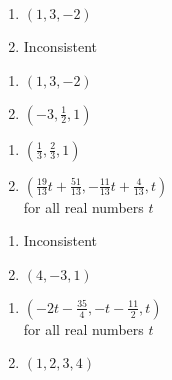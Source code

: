 \begin{multicols}{2}
\begin{enumerate}
\setcounter{enumi}{\value{HW}}

\item $(1,3,-2)$
\item Inconsistent


\setcounter{HW}{\value{enumi}}
\end{enumerate}
\end{multicols}


\begin{multicols}{2}
\begin{enumerate}
\setcounter{enumi}{\value{HW}}


\item $(1,3,-2)$
\item $\left(-3,\frac{1}{2},1\right)$

\setcounter{HW}{\value{enumi}}
\end{enumerate}
\end{multicols}


\begin{multicols}{2}
\begin{enumerate}
\setcounter{enumi}{\value{HW}}



\item  $\left(\frac{1}{3},\frac{2}{3},1\right)$
\item  $\left(\frac{19}{13} t + \frac{51}{13},-\frac{11}{13} t+\frac{4}{13},t\right)$\\
for all real numbers $t$

\setcounter{HW}{\value{enumi}}
\end{enumerate}
\end{multicols}


\begin{multicols}{2}
\begin{enumerate}
\setcounter{enumi}{\value{HW}}

\item Inconsistent
\item $\left(4,-3,1\right)$

\setcounter{HW}{\value{enumi}}
\end{enumerate}
\end{multicols}


\begin{multicols}{2}
\begin{enumerate}
\setcounter{enumi}{\value{HW}}


\item $\left(-2t - \frac{35}{4},-t - \frac{11}{2},t\right)$\\
for all real numbers $t$
\item $(1, 2, 3, 4)$

\setcounter{HW}{\value{enumi}}
\end{enumerate}
\end{multicols}

